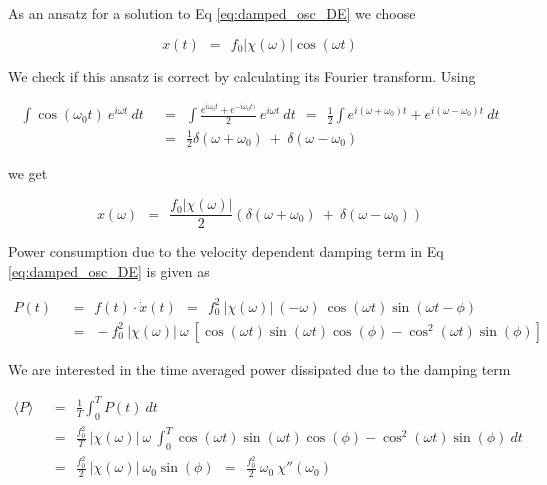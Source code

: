 \documentclass[10pt]{report}
\numberwithin{equation}{chapter}
\newcommand{\refEq}[1]{
  Eq  \ref{#1}
}
\begin{document}
As an ansatz for a solution to \refEq{eq:damped_osc_DE} we choose

\begin{equation}
  x(t) ~~=~~ f_0 | \chi(\omega) | \cos(\omega t)
\end{equation}


We check if this ansatz is correct by calculating its Fourier transform. Using



\begin{align}
  \int \cos(\omega_0 t)\ e^{i\omega t}\ dt 
  ~~& =~~ \int \frac{e^{i\omega_0 t} + e^{-i\omega_0 t)}}{2}\ e^{i\omega t}\ dt
  ~~=~~ \frac{1}{2} \int e^{i(\omega + \omega_0)t} + e^{i(\omega - \omega_0)t}\ dt\nonumber \\
  ~~& =~~ \frac{1}{2} \delta(\omega + \omega_0) ~+~ \delta(\omega - \omega_0)
\end{align}

we get

\begin{equation}
  x(\omega) ~~=~~  \frac{f_0 |\chi(\omega)|}{2} (\delta(\omega + \omega_0) ~+~ \delta(\omega - \omega_0))
\end{equation}


%


Power consumption due to the velocity dependent damping term in \refEq{eq:damped_osc_DE} is given as

\begin{align}
  P(t) ~~& =~~ f(t) \cdot \dot{x}(t) ~~=~~ f_0^2\ |\chi(\omega)|\ (-\omega)\ \cos(\omega t) \sin(\omega t - \phi)\nonumber \\
  ~~& =~~ - f_0^2\ |\chi(\omega)|\ \omega\ \left[ \cos(\omega t) \sin(\omega t) \cos(\phi) - \cos^2(\omega t) \sin(\phi) \right]
\end{align}


We are interested in the time averaged power dissipated due to the damping term

\begin{align}
  \langle P \rangle ~~& =~~ \frac{1}{T} \int_0^T P(t)\ dt \nonumber \\ 
  ~~& =~~ \frac{f_0^2}{T}\ |\chi(\omega)|\ \omega\ \int_0^T \cos(\omega t) \sin(\omega t) \cos(\phi) - 
  \cos^2(\omega t) \sin(\phi)\ dt \nonumber \\
  ~~& =~~ \frac{f_0^2}{2}\ |\chi(\omega)|\ \omega_0 \sin(\phi) 
  ~~=~~ \frac{f_0^2}{2}\ \omega_0\ \chi''(\omega_0)
\end{align}
\end{document}
